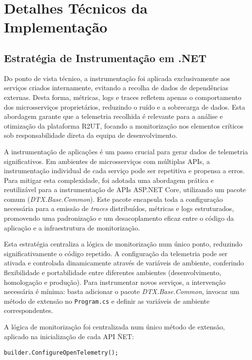 \section{Detalhes Técnicos da Implementação}

\subsection{Estratégia de Instrumentação em .NET}

Do ponto de vista técnico, a instrumentação foi aplicada exclusivamente aos serviços criados internamente, evitando a recolha de dados de dependências externas. Desta forma, métricas, logs e traces refletem apenas o comportamento dos microsserviços proprietários, reduzindo o ruído e a sobrecarga de dados. Esta abordagem garante que a telemetria recolhida é relevante para a análise e otimização da plataforma R2UT, focando a monitorização nos elementos críticos sob responsabilidade direta da equipa de desenvolvimento.

A instrumentação de aplicações é um passo crucial para gerar dados de telemetria significativos. Em ambientes de microsserviços com múltiplas APIs, a instrumentação individual de cada serviço pode ser repetitiva e propensa a erros. Para mitigar esta complexidade, foi adotada uma abordagem prática e reutilizável para a instrumentação de APIs ASP.NET Core, utilizando um pacote comum (\textit{DTX.Base.Common}). Este pacote encapsula toda a configuração necessária para a emissão de \textit{traces} distribuídos, métricas e logs estruturados, promovendo uma padronização e um desacoplamento eficaz entre o código da aplicação e a infraestrutura de monitorização.

Esta estratégia centraliza a lógica de monitorização num único ponto, reduzindo significativamente o código repetido. A configuração da telemetria pode ser ativada e controlada dinamicamente através de variáveis de ambiente, conferindo flexibilidade e portabilidade entre diferentes ambientes (desenvolvimento, homologação e produção). Para instrumentar novos serviços, a intervenção necessária é mínima: basta adicionar o pacote \textit{DTX.Base.Common}, invocar um método de extensão no \texttt{Program.cs} e definir as variáveis de ambiente correspondentes.

A lógica de monitorização foi centralizada num único método de extensão, aplicado na inicialização de cada API \.NET:

\begin{verbatim}
builder.ConfigureOpenTelemetry();
\end{verbatim}

